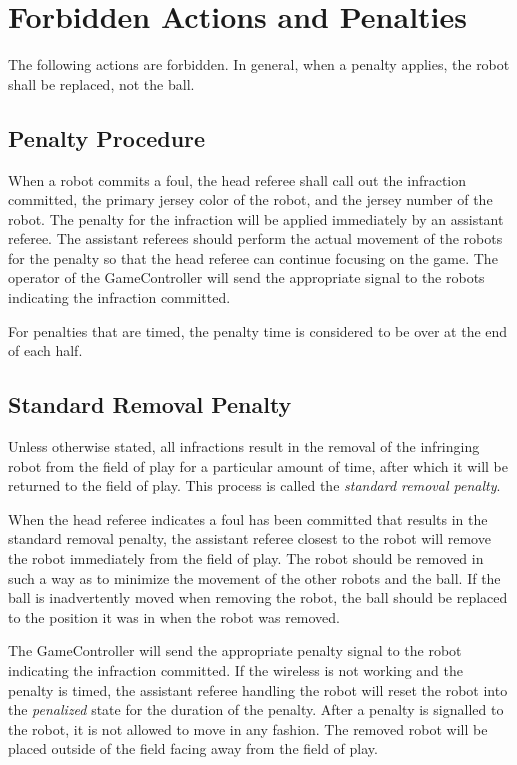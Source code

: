 \documentclass[12pt]{article}
\begin{document}
\newpage


\section{Forbidden Actions and Penalties}
\label{sec:forbidden_act}

The following actions are forbidden. In general, when a penalty applies, the robot shall be replaced, not the ball.

\subsection{Penalty Procedure}
\label{sec:penalty_procedure}

When a robot commits a foul, the head referee shall call out the infraction committed, the primary jersey color of the robot, and the jersey number of the robot. The penalty for the infraction will be applied immediately by an assistant referee. The assistant referees should perform the actual movement of the robots for the penalty so that the head referee can continue focusing on the game. The operator of the GameController will send the appropriate signal to the robots indicating the infraction committed.

For penalties that are timed, the penalty time is considered to be over at the end of each half.

\subsection{Standard Removal Penalty}
\label{sec:removal_penalty}

Unless otherwise stated, all infractions result in the removal of the infringing robot from the field of play for a particular amount of time, after which it will be returned to the field of play. This process is called the \textit{standard removal penalty}.

When the head referee indicates a foul has been committed that results in the standard removal penalty, the assistant referee closest to the robot will remove the robot immediately from the field of play. The robot should be removed in such a way as to minimize the movement of the other robots and the ball. If the ball is inadvertently moved when removing the robot, the ball should be replaced to the position it was in when the robot was removed.

The GameController will send the appropriate penalty signal to the robot indicating the infraction committed. If the wireless is not working and the penalty is timed, the assistant referee handling the robot will reset the robot into the \emph{penalized} state for the duration of the penalty. After a penalty is signalled to the robot, it is not allowed to move in any fashion. The removed robot will be placed outside of the field facing away from the field of play.
\end{document}
